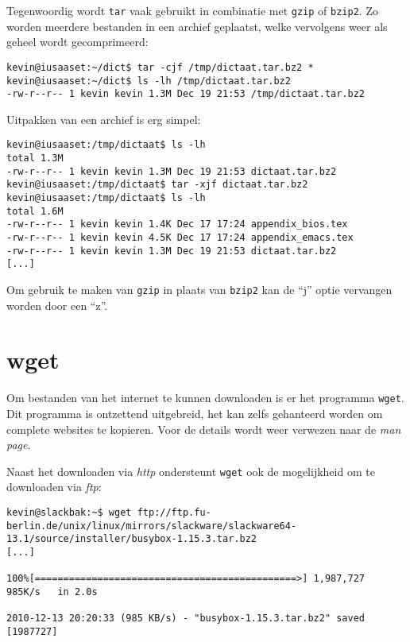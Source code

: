 Tegenwoordig wordt \texttt{tar} vaak gebruikt in combinatie met \texttt{gzip} of \texttt{bzip2}. Zo worden meerdere bestanden in een archief geplaatst, welke vervolgens weer als geheel wordt gecomprimeerd:
\begin{lstlisting}
kevin@iusaaset:~/dict$ tar -cjf /tmp/dictaat.tar.bz2 *
kevin@iusaaset:~/dict$ ls -lh /tmp/dictaat.tar.bz2 
-rw-r--r-- 1 kevin kevin 1.3M Dec 19 21:53 /tmp/dictaat.tar.bz2
\end{lstlisting}

Uitpakken van een archief is erg simpel:
\begin{lstlisting}
kevin@iusaaset:/tmp/dictaat$ ls -lh
total 1.3M
-rw-r--r-- 1 kevin kevin 1.3M Dec 19 21:53 dictaat.tar.bz2
kevin@iusaaset:/tmp/dictaat$ tar -xjf dictaat.tar.bz2 
kevin@iusaaset:/tmp/dictaat$ ls -lh
total 1.6M
-rw-r--r-- 1 kevin kevin 1.4K Dec 17 17:24 appendix_bios.tex
-rw-r--r-- 1 kevin kevin 4.5K Dec 17 17:24 appendix_emacs.tex
-rw-r--r-- 1 kevin kevin 1.3M Dec 19 21:53 dictaat.tar.bz2
[...]
\end{lstlisting}%
Om gebruik te maken van \texttt{gzip} in plaats van \texttt{bzip2} kan de ``j'' optie vervangen worden door een ``z''. 

\section{wget}
Om bestanden van het internet te kunnen downloaden is er het programma \texttt{wget}. Dit programma is ontzettend uitgebreid, het kan zelfs gehanteerd worden om complete websites te kopieren. Voor de details wordt weer verwezen naar de \emph{man page}. 

Naast het downloaden via \emph{http} ondersteunt \texttt{wget} ook de mogelijkheid om te downloaden via \emph{ftp}: 
\begin{lstlisting}
kevin@slackbak:~$ wget ftp://ftp.fu-berlin.de/unix/linux/mirrors/slackware/slackware64-13.1/source/installer/busybox-1.15.3.tar.bz2    
[...]

100%[==============================================>] 1,987,727    985K/s   in 2.0s    

2010-12-13 20:20:33 (985 KB/s) - "busybox-1.15.3.tar.bz2" saved [1987727]
\end{lstlisting}%
